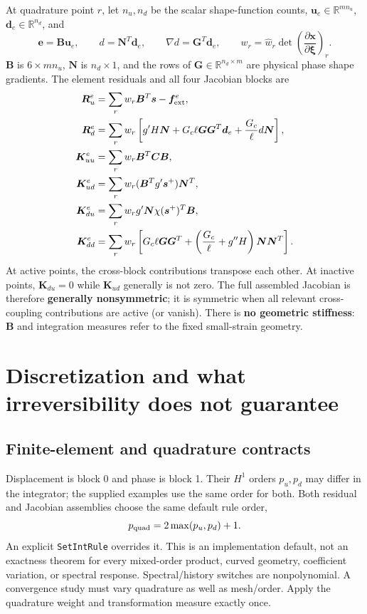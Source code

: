 \documentclass[11pt,a4paper]{article}
\newcommand{\code}[1]{\texttt{\small #1}}
\newcommand{\sectionpage}[1]{\clearpage\section{#1}}
\numberwithin{equation}{section}
\begin{document}
At quadrature point $r$, let $n_u,n_d$ be the scalar shape-function counts,
$\bm u_e\in\mathbb R^{mn_u}$, $\bm d_e\in\mathbb R^{n_d}$, and
\begin{equation}
 \bm e=\bm B\bm u_e,\qquad d=\bm N^T\bm d_e,\qquad
 \nabla d=\bm G^T\bm d_e,\qquad
 w_r=\widehat w_r\det\left(\frac{\partial\bm x}{\partial\bm\xi}\right)_r.
\end{equation}
$\bm B$ is $6\times mn_u$, $\bm N$ is $n_d\times1$, and the rows of
$\bm G\in\mathbb R^{n_d\times m}$ are physical phase shape gradients.
The element residuals and all four Jacobian blocks are
\begin{align}
 \bm R_u^e&=\sum_r w_r\bm B^T\bm s-\bm f^e_{\rm ext},\\
 \bm R_d^e&=\sum_r w_r\left[g'H\bm N
           +G_c\ell\bm G\bm G^T\bm d_e+\frac{G_c}{\ell}d\bm N\right],\\
 \bm K_{uu}^e&=\sum_r w_r\bm B^T\bm C\bm B,\label{eq:Kuu}\\
 \bm K_{ud}^e&=\sum_r w_r(\bm B^Tg'\bm s^+)\bm N^T,\\
 \bm K_{du}^e&=\sum_r w_r g'\bm N\chi(\bm s^+)^T\bm B,\\
 \bm K_{dd}^e&=\sum_r w_r\left[G_c\ell\bm G\bm G^T
                +\left(\frac{G_c}{\ell}+g''H\right)\bm N\bm N^T\right].
 \label{eq:Kdd}
\end{align}
At active points, the cross-block contributions transpose each other. At
inactive points, $\bm K_{du}=0$ while $\bm K_{ud}$ generally is not zero.
The full assembled Jacobian is therefore \textbf{generally nonsymmetric}; it
is symmetric when all relevant cross-coupling contributions are active (or
vanish). There is \textbf{no geometric stiffness}: $\bm B$ and integration
measures refer to the fixed small-strain geometry.

\sectionpage{Discretization and what irreversibility does not guarantee}
\label{sec:discrete}
\subsection{Finite-element and quadrature contracts}
Displacement is block 0 and phase is block 1. Their $H^1$ orders $p_u,p_d$ may
differ in the integrator; the supplied examples use the same order for both.
Both residual and Jacobian assemblies choose the same default rule order,
\begin{equation}p_{\rm quad}=2\max(p_u,p_d)+1.\end{equation}
An explicit \code{SetIntRule} overrides it. This is an implementation default,
not an exactness theorem for every mixed-order product, curved geometry,
coefficient variation, or spectral response. Spectral/history switches are
nonpolynomial. A convergence study must vary quadrature as well as mesh/order.
Apply the quadrature weight and transformation measure exactly once.
\end{document}
